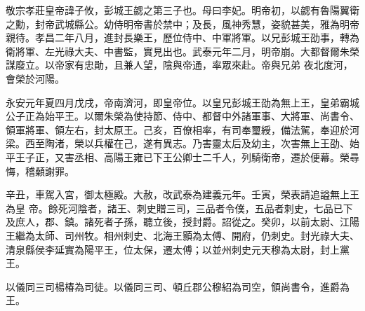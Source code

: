 
\begin{pinyinscope}

 敬宗孝莊皇帝諱子攸，彭城王勰之第三子也。母曰李妃。明帝初，以勰有魯陽翼衛之勳，封帝武城縣公。幼侍明帝書於禁中；及長，風神秀慧，姿貌甚美，雅為明帝親待。孝昌二年八月，進封長樂王，歷位侍中、中軍將軍。以兄彭城王劭事，轉為衛將軍、左光祿大夫、中書監，實見出也。武泰元年二月，明帝崩。大都督爾朱榮謀廢立。以帝家有忠勛，且兼人望，陰與帝通，率眾來赴。帝與兄弟
 夜北度河，會榮於河陽。



 永安元年夏四月戊戌，帝南濟河，即皇帝位。以皇兄彭城王劭為無上王，皇弟霸城公子正為始平王。以爾朱榮為使持節、侍中、都督中外諸軍事、大將軍、尚書令、領軍將軍、領左右，封太原王。己亥，百僚相率，有司奉璽綬，備法駕，奉迎於河梁。西至陶渚，榮以兵權在己，遂有異志。乃害靈太后及幼主，次害無上王劭、始平王子正，又害丞相、高陽王雍已下王公卿士二千人，列騎衛帝，遷於便幕。榮尋悔，稽顙謝罪。



 辛丑，車駕入宮，御太極殿。大赦，改武泰為建義元年。壬寅，榮表請追謚無上王為皇
 帝。餘死河陰者，諸王、刺史贈三司，三品者令僕，五品者刺史，七品已下及庶人，郡、鎮。諸死者子孫，聽立後，授封爵。詔從之。癸卯，以前太尉、江陽王繼為太師、司州牧。相州刺史、北海王顥為太傅、開府，仍刺史。封光祿大夫、清泉縣侯李延實為陽平王，位太保，遷太傅；以並州刺史元天穆為太尉，封上黨王。



 以儀同三司楊椿為司徒。以儀同三司、頓丘郡公穆紹為司空，領尚書令，進爵為王。




\end{pinyinscope}
